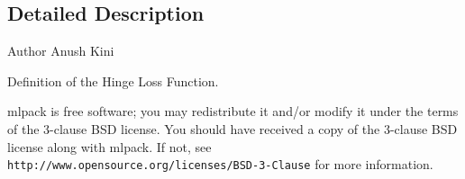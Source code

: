 \subsection{Detailed Description}
\begin{DoxyAuthor}{Author}
Anush Kini
\end{DoxyAuthor}
Definition of the Hinge Loss Function.

mlpack is free software; you may redistribute it and/or modify it under the terms of the 3-\/clause B\+SD license. You should have received a copy of the 3-\/clause B\+SD license along with mlpack. If not, see {\tt http\+://www.\+opensource.\+org/licenses/\+B\+S\+D-\/3-\/\+Clause} for more information. 